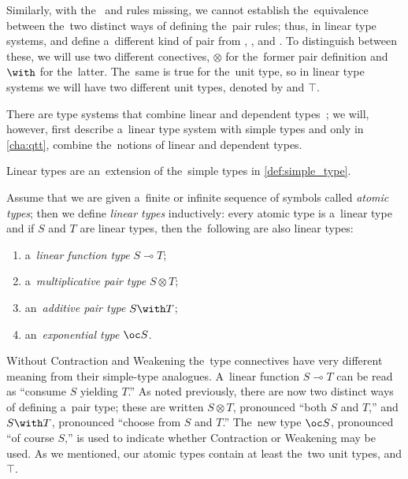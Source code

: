 Similarly, with the~ and  rules missing, we cannot establish
the~equivalence between the~two distinct ways of defining the~pair rules; thus,
in linear type systems,  and  define a~different
kind of pair from , , and
. To distinguish between these, we will use two different
conectives, $\otimes$ for the~former pair definition and $\with$ for the~latter.
The~same is true for the~unit type, so in linear type systems we will have two
different unit types, denoted by \1 and $\top$.

There are type systems that combine linear and dependent
types~\citep{cervesato_pfenning_2002, krishnaswami_et_al_2015}; we will,
however, first describe a~linear type system with simple types and only in
\autoref{cha:qtt}, combine the~notions of linear and dependent types.


Linear types are an~extension of the~simple types in \autoref{def:simple_type}.

\begin{definition}
  Assume that we are given a~finite or infinite sequence of symbols called
  \emph{atomic types}; then we define \emph{linear types} inductively: every
  atomic type is a~linear type and if $S$ and $T$ are linear types, then
  the~following are also linear types:
  \begin{enumerate}
    \item a~\emph{linear function type} $S \multimap T$;
    \item a~\emph{multiplicative pair type} $S \otimes T$;
    \item an~\emph{additive pair type} $S \with T$;
    \item an~\emph{exponential type} $\oc S$.
  \end{enumerate}
\end{definition}

Without Contraction and Weakening the~type connectives have very different
meaning from their simple-type analogues. A~linear function $S \multimap T$ can
be read as ``consume $S$ yielding $T$.'' As noted previously, there are now two
distinct ways of defining a~pair type; these are written $S \otimes T$,
pronounced ``both $S$ and $T$,'' and $S \with T$, pronounced ``choose from $S$
and $T$.'' The~new type $\oc S$, pronounced ``of course $S$,'' is used to
indicate whether Contraction or Weakening may be used. As we mentioned, our
atomic types contain at least the~two unit types, \1 and $\top$.

